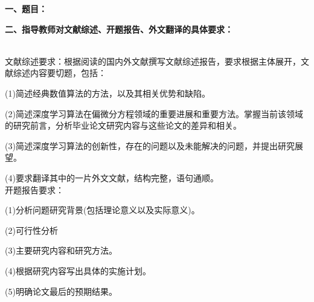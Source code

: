 {
    \setlength{\parindent}{0em}
    \par {\bfseries 一、题目：\Title}
    \\
    \par {\bfseries 二、指导教师对文献综述、开题报告、外文翻译的具体要求：}
}
\\
文献综述要求：根据阅读的国内外文献撰写文献综述报告，要求根据主体展开，文献综述内容要切题，包括：

(1)简述经典数值算法的方法，以及其相关优势和缺陷。

(2)简述深度学习算法在偏微分方程领域的重要进展和重要方法。掌握当前该领域的研究前言，分析毕业论文研究内容与这些论文的差异和相关。

(3)简述深度学习算法的创新性，存在的问题以及未能解决的问题，并提出研究展望。

(4)要求翻译其中的一片外文文献，结构完整，语句通顺。
\\
开题报告要求：

(1)分析问题研究背景(包括理论意义以及实际意义)。

(2)可行性分析

(3)主要研究内容和研究方法。

(4)根据研究内容写出具体的实施计划。

(5)明确论文最后的预期结果。


\signature{指导教师（签名）}
